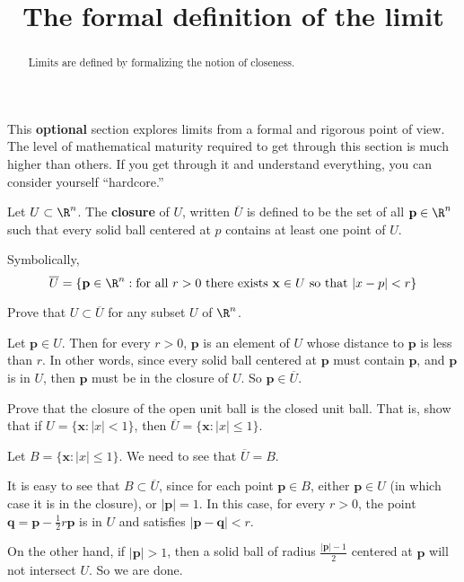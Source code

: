 \documentclass{ximera}
\title{The formal definition of the limit}
\begin{document}
\begin{abstract}
	Limits are defined by formalizing the notion of closeness.
\end{abstract}
\maketitle


This \textbf{optional} section explores limits from a formal and rigorous point of view.   
The level of mathematical maturity required to get through this section is much higher than others. 
If you get through it and understand everything, you can consider yourself ``hardcore.''

\begin{definition}
	Let $U \subset \R^n$.  The \textbf{closure} of $U$, written $\overline{U}$ is defined to be the set of all $\mathbf{p} \in \R^n$ such that
	every solid ball centered at $p$ contains at least one point of $U$.

        Symbolically,
	\[\overline{U} = \{ \mathbf{p} \in \R^n : \text{for all $r>0$ there exists $\mathbf{x} \in U$ so that $|x-p|<r$} \}\]
\end{definition}

Prove that $U \subset \overline{U}$ for any subset $U$ of $\R^n$.
\begin{free-response}
	
	Let $\mathbf{p} \in U$.  Then for every $r >0$, $\mathbf{p}$ is an element of $U$ whose distance to $\mathbf{p}$ is less than $r$.  In other words,
	since every solid ball centered at $\mathbf{p}$ must contain $\mathbf{p}$, and $\mathbf{p}$ is in $U$, then $\mathbf{p}$ must be in the closure of $U$. 
	So $\mathbf{p} \in \overline{U}$.
	
\end{free-response}


Prove that the closure of the open unit ball is the closed unit ball.  That is, show that if $U = \{\mathbf{x}:|x|<1\}$, then $\overline{U}  = \{\mathbf{x}:|x|\leq 1\}$.

\begin{free-response}
	 Let $B = \{\mathbf{x}:|x|\leq 1\}$.  We need to see that $\overline{U} = B$.
	 
	 It is easy to see that $B \subset \overline{U}$, since for each point $\mathbf{p} \in B$, either $\mathbf{p} \in U$ (in which case it is in the closure), 
	 or $|\mathbf{p}| = 1$.  In this case, for every $r > 0$, the point $\mathbf{q} = \mathbf{p} - \frac{1}{2}r\mathbf{p}$ is in $U$ and satisfies 
	  $|\mathbf{p} - \mathbf{q}|<r$.
	  
	  On the other hand, if $|\mathbf{p}|>1$, then a solid ball of radius $\frac{|\mathbf{p}|-1}{2}$ centered at $\mathbf{p}$ will not intersect $U$.  So we are done.
\end{free-response}
\end{document}
